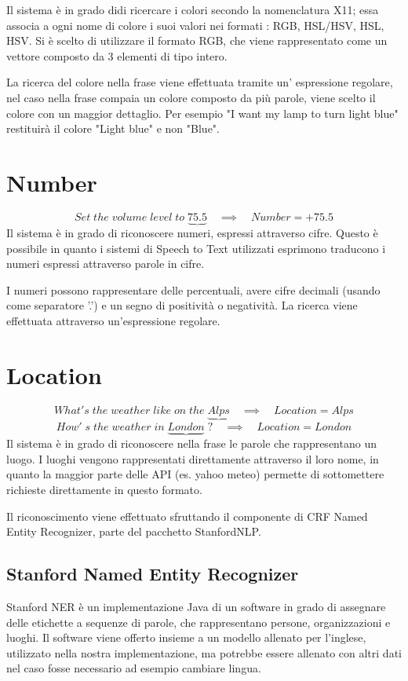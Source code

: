 \documentclass[twoside]{supsistudent}
\begin{document}
Il sistema è in grado didi ricercare i colori secondo la nomenclatura X11; essa associa a ogni nome di colore i suoi valori nei formati : RGB, HSL/HSV, HSL, HSV. Si è scelto di utilizzare il formato RGB, che viene rappresentato come un vettore composto da 3 elementi di tipo intero.\cite{x11Colors}

La ricerca del colore nella frase viene effettuata tramite un' espressione regolare, nel caso nella frase compaia un colore composto da più parole, viene scelto il colore con un maggior dettaglio.
Per esempio "I want my lamp to turn light blue" restituirà il colore "Light blue" e non "Blue".
\section{Number}
\[
Set\;the\;volume\;level\;to\;
\underbrace{75.5}
\quad\implies\quad Number = +75.5
\]
Il sistema è in grado di riconoscere numeri, espressi attraverso cifre. Questo è possibile in quanto i sistemi di Speech to Text utilizzati esprimono traducono i numeri espressi attraverso parole in cifre.

I numeri possono rappresentare delle percentuali, avere cifre decimali (usando come separatore '.') e un segno di positività o negatività. La ricerca viene effettuata attraverso un'espressione regolare.
\section{Location}
\[
What's\;the\;weather\;like\;on\;the\;
\underbrace{Alps}
\quad\implies\quad Location = Alps
\]
\[
How'\;s\;the\;weather\;in\;
\underbrace{London}\;?
\quad\implies\quad Location = London
\]
Il sistema è in grado di riconoscere nella frase le parole che rappresentano un luogo.
I luoghi vengono rappresentati direttamente attraverso il loro nome, in quanto la maggior parte delle API (es. yahoo meteo) permette di sottomettere richieste direttamente in questo formato.

Il riconoscimento viene effettuato sfruttando il componente di CRF Named Entity Recognizer, parte del pacchetto StanfordNLP. \cite{stanfordNer}
\subsection{Stanford Named Entity Recognizer}
Stanford NER è un implementazione Java di un software in grado di assegnare delle etichette a sequenze di parole, che rappresentano persone, organizzazioni e luoghi.
Il software viene offerto insieme a un modello allenato per l'inglese, utilizzato nella nostra implementazione, ma potrebbe essere allenato con altri dati nel caso fosse necessario ad esempio cambiare lingua.
\end{document}
